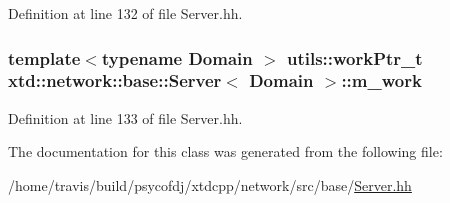 Definition at line 132 of file Server.\-hh.

\hypertarget{classxtd_1_1network_1_1base_1_1Server_ad762843698e4e7b4e70974c2daab0932}{
\subsubsection[{m\-\_\-work}]{\setlength{\rightskip}{0pt plus 5cm}template$<$typename Domain $>$ {\bf utils\-::work\-Ptr\-\_\-t} {\bf xtd\-::network\-::base\-::\-Server}$<$ Domain $>$\-::m\-\_\-work\hspace{0.3cm}{\ttfamily [protected]}}}\label{classxtd_1_1network_1_1base_1_1Server_ad762843698e4e7b4e70974c2daab0932}


Definition at line 133 of file Server.\-hh.



The documentation for this class was generated from the following file\-:\begin{DoxyCompactItemize}
\item 
/home/travis/build/psycofdj/xtdcpp/network/src/base/\hyperlink{base_2Server_8hh}{Server.\-hh}\end{DoxyCompactItemize}

